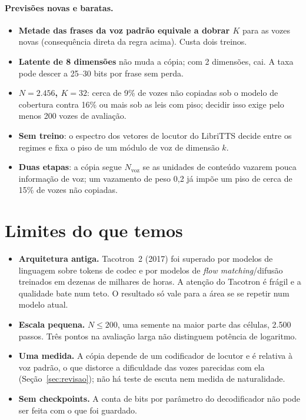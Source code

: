 \documentclass[a4paper,11pt]{article}
\begin{document}
\paragraph{Previsões novas e baratas.}
\begin{itemize}
\item \textbf{Metade das frases da voz padrão equivale a dobrar $K$} para as vozes novas (consequência direta da regra acima). Custa dois treinos.
\item \textbf{Latente de 8 dimensões} não muda a cópia; com 2 dimensões, cai. A taxa pode descer a 25--30 bits por frase sem perda.
\item \textbf{$N=2.456$, $K=32$}: cerca de 9\% de vozes não copiadas sob o modelo de cobertura contra 16\% ou mais sob as leis com piso; decidir isso exige pelo menos 200 vozes de avaliação.
\item \textbf{Sem treino}: o espectro dos vetores de locutor do LibriTTS decide entre os regimes e fixa o piso de um módulo de voz de dimensão $k$.
\item \textbf{Duas etapas}: a cópia segue $N_{\text{voz}}$ se as unidades de conteúdo vazarem pouca informação de voz; um vazamento de peso 0,2 já impõe um piso de cerca de 15\% de vozes não copiadas.
\end{itemize}

\section{Limites do que temos}
\label{sec:limites}
\begin{itemize}
\item \textbf{Arquitetura antiga.} Tacotron~2 (2017) foi superado por modelos de linguagem sobre tokens de codec e por modelos de \textit{flow matching}/difusão treinados em dezenas de milhares de horas. A atenção do Tacotron é frágil e a qualidade bate num teto. O resultado só vale para a área se se repetir num modelo atual.
\item \textbf{Escala pequena.} $N\le200$, uma semente na maior parte das células, 2.500 passos. Três pontos na avaliação larga não distinguem potência de logaritmo.
\item \textbf{Uma medida.} A cópia depende de um codificador de locutor e é relativa à voz padrão, o que distorce a dificuldade das vozes parecidas com ela (Seção~\ref{sec:revisao}); não há teste de escuta nem medida de naturalidade.
\item \textbf{Sem checkpoints.} A conta de bits por parâmetro do decodificador não pode ser feita com o que foi guardado.
\end{itemize}
\end{document}
